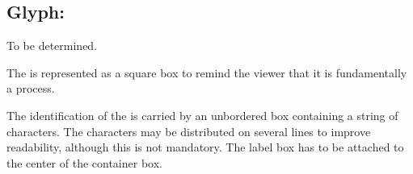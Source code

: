 \subsection{Glyph: }
\label{sec:submap}

\begin{glyphDescription}

\glyphSboTerm To be determined.

\glyphContainer The  is represented as a square box to remind the viewer that it is fundamentally a process.

\glyphLabel The identification of the  is carried by an unbordered box containing a string of characters.  The characters may be distributed on several lines to improve readability, although this is not mandatory.  The label box has to be attached to the center of the container box.

\end{glyphDescription}

